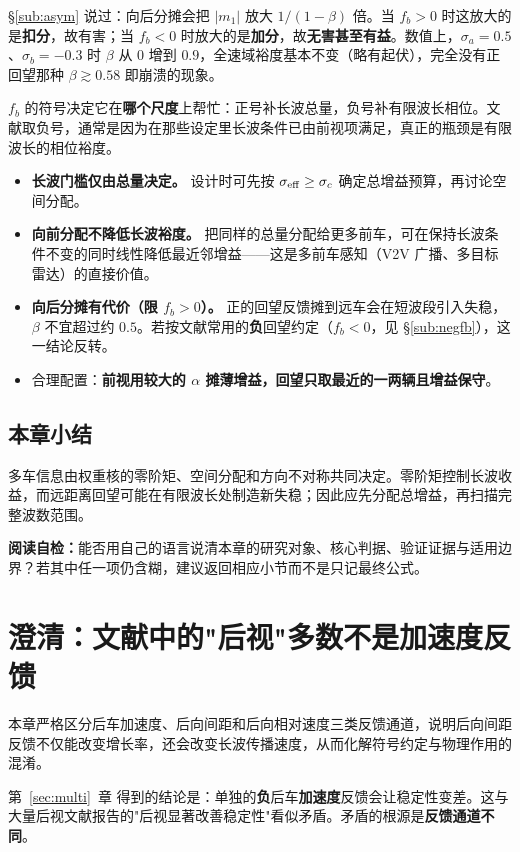 \documentclass[11pt,a4paper,openany]{book}
\numberwithin{equation}{chapter}
\numberwithin{figure}{chapter}
\numberwithin{table}{chapter}
\newcommand{\sectionwrapup}[1]{%
  \section{本章小结}
  \begin{tcolorbox}[summarybox,title=\textbf{章末回顾}]
  #1
  \par\smallskip
  \textbf{阅读自检：}能否用自己的语言说清本章的研究对象、核心判据、验证证据与适用边界？若其中任一项仍含糊，建议返回相应小节而不是只记最终公式。
  \end{tcolorbox}
  \clearpage
}
\newcommand{\chapterguide}[2]{%
  \begin{tcolorbox}[chapterguide,title=\textbf{本章导学：#1}]
  #2
  \end{tcolorbox}}
\begin{document}
\S\ref{sub:asym} 说过：向后分摊会把 $|m_1|$ 放大 $1/(1-\beta)$ 倍。当 $f_b>0$ 时这放大的是\textbf{扣分}，故有害；当 $f_b<0$ 时放大的是\textbf{加分}，故\textbf{无害甚至有益}。数值上，$\sigma_a=0.5$、$\sigma_b=-0.3$ 时 $\beta$ 从 $0$ 增到 $0.9$，全速域裕度基本不变（略有起伏），完全没有正回望那种 $\beta\gtrsim0.58$ 即崩溃的现象。

\begin{tcolorbox}[notebox,title=\textbf{一句话总结}]
$f_b$ 的符号决定它在\textbf{哪个尺度}上帮忙：正号补长波总量，负号补有限波长相位。文献取负号，通常是因为在那些设定里长波条件已由前视项满足，真正的瓶颈是有限波长的相位裕度。
\end{tcolorbox}

\begin{tcolorbox}[notebox,title=\textbf{工程结论}]
\begin{itemize}[leftmargin=1.2em,itemsep=3pt]
\item \textbf{长波门槛仅由总量决定。} 设计时可先按 $\sigma_{\rm eff}\ge\sigma_c$ 确定总增益预算，再讨论空间分配。
\item \textbf{向前分配不降低长波裕度。} 把同样的总量分配给更多前车，可在保持长波条件不变的同时线性降低最近邻增益——这是多前车感知（V2V 广播、多目标雷达）的直接价值。
\item \textbf{向后分摊有代价（限 $f_b>0$）。} 正的回望反馈摊到远车会在短波段引入失稳，$\beta$ 不宜超过约 $0.5$。若按文献常用的\textbf{负}回望约定（$f_b<0$，见 \S\ref{sub:negfb}），这一结论反转。
\item 合理配置：\textbf{前视用较大的 $\alpha$ 摊薄增益，回望只取最近的一两辆且增益保守}。
\end{itemize}
\end{tcolorbox}

\sectionwrapup{多车信息由权重核的零阶矩、空间分配和方向不对称共同决定。零阶矩控制长波收益，而远距离回望可能在有限波长处制造新失稳；因此应先分配总增益，再扫描完整波数范围。}

\chapter{澄清：文献中的"后视"多数不是加速度反馈}
\label{sec:reargap}
\chapterguide{为什么不同“后视”研究会给出相反结论}{本章严格区分后车加速度、后向间距和后向相对速度三类反馈通道，说明后向间距反馈不仅能改变增长率，还会改变长波传播速度，从而化解符号约定与物理作用的混淆。}

第~\ref{sec:multi}~章 得到的结论是：单独的\textbf{负}后车\textbf{加速度}反馈会让稳定性变差。这与大量后视文献报告的"后视显著改善稳定性"看似矛盾。矛盾的根源是\textbf{反馈通道不同}。
\end{document}
